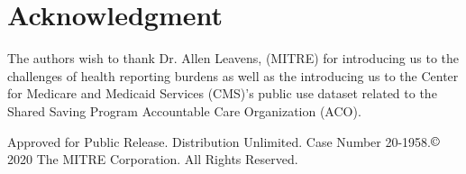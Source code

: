 \documentclass[conference]{IEEEtran}
\begin{document}
\section{Acknowledgment}
The authors wish to thank Dr. Allen Leavens, (MITRE) for introducing us to the challenges of health reporting burdens as well as the introducing us to the Center for Medicare and Medicaid Services (CMS)'s public use dataset related to the Shared Saving Program Accountable Care Organization (ACO).  

Approved for Public Release. Distribution Unlimited. Case Number 20-1958.$\copyright$ 2020 The MITRE Corporation. All Rights Reserved.




\newpage
\listoftodos[Notes]
\end{document}
